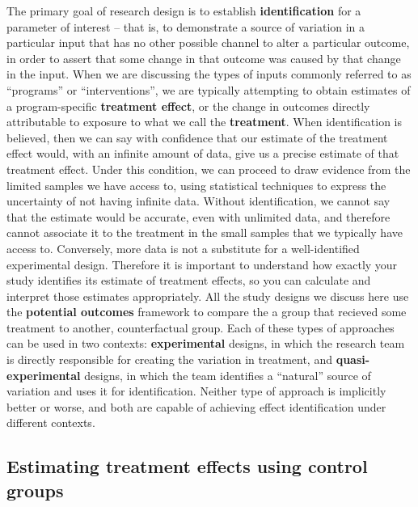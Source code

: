 The primary goal of research design is to establish \textbf{identification}
for a parameter of interest -- that is, to demonstrate
a source of variation in a particular input that has no other possible channel
to alter a particular outcome, in order to assert that some change in that outcome
was caused by that change in the input.
When we are discussing the types of inputs commonly referred to as
``programs'' or ``interventions'', we are typically attempting to obtain estimates
of a program-specific \textbf{treatment effect}, or the change in outcomes
directly attributable to exposure to what we call the \textbf{treatment}.\cite{abadie2018econometric}
When identification is believed, then we can say with confidence
that our estimate of the treatment effect would,
with an infinite amount of data,
give us a precise estimate of that treatment effect.
Under this condition, we can proceed to draw evidence from the limited samples we have access to,
using statistical techniques to express the uncertainty of not having infinite data.
Without identification, we cannot say that the estimate would be accurate,
even with unlimited data, and therefore cannot associate it to the treatment
in the small samples that we typically have access to.
Conversely, more data is not a substitute for a well-identified experimental design.
Therefore it is important to understand how exactly your study
identifies its estimate of treatment effects,
so you can calculate and interpret those estimates appropriately.
All the study designs we discuss here use the \textbf{potential outcomes} framework
to compare the a group that recieved some treatment to another, counterfactual group.
Each of these types of approaches can be used in two contexts:
\textbf{experimental} designs, in which the research team
is directly responsible for creating the variation in treatment,
and \textbf{quasi-experimental} designs, in which the team
identifies a ``natural'' source of variation and uses it for identification.
Neither type of approach is implicitly better or worse,
and both are capable of achieving effect identification under different contexts.

\subsection{Estimating treatment effects using control groups}

